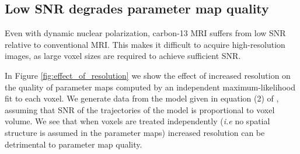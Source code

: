 \documentclass{article}
\begin{document}
\subsection{Low SNR degrades parameter map quality} 

Even with dynamic nuclear polarization, carbon-13 MRI suffers from low SNR relative to conventional MRI. This makes it difficult to acquire high-resolution images, as large voxel sizes are required to achieve sufficient SNR. 

In Figure \ref{fig:effect_of_resolution} we show the effect of increased resolution on the quality of parameter maps computed by an independent maximum-likelihood fit to each voxel. We generate data from the model given in equation (2) of \cite{Maidens16}, assuming that SNR of the trajectories of the model is proportional to voxel volume. We see that when voxels are treated independently (\emph{i.e} no spatial structure is assumed in the parameter maps) increased resolution can be detrimental to parameter map quality. 
\end{document}
